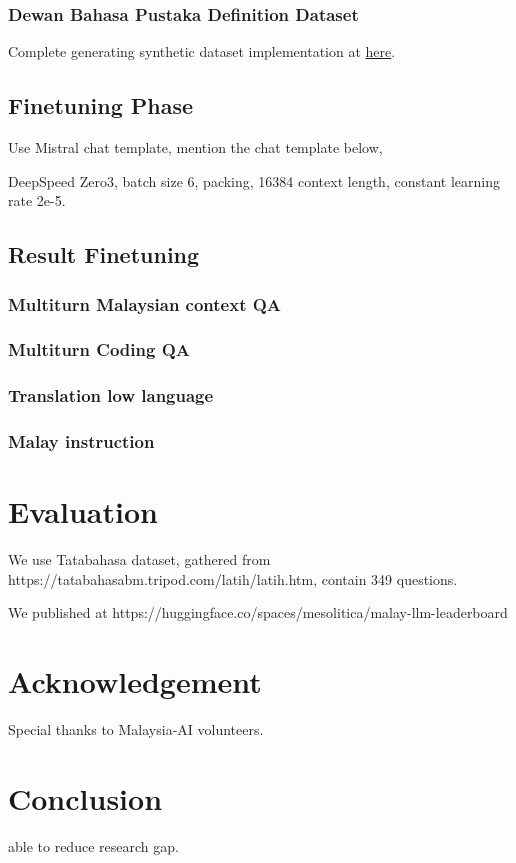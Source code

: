 \documentclass{article}
\begin{document}
\subsubsection{Dewan Bahasa Pustaka Definition Dataset}

Complete generating synthetic dataset implementation at \href{https://a.com}{here}.

\subsection{Finetuning Phase}

Use Mistral chat template, mention the chat template below,

DeepSpeed Zero3, batch size 6, packing, 16384 context length, constant learning rate 2e-5.


\subsection{Result Finetuning}

\subsubsection{Multiturn Malaysian context QA}

\subsubsection{Multiturn Coding QA}

\subsubsection{Translation low language}

\subsubsection{Malay instruction}

\section{Evaluation}

We use Tatabahasa dataset, gathered from https://tatabahasabm.tripod.com/latih/latih.htm, contain 349 questions.

We published at https://huggingface.co/spaces/mesolitica/malay-llm-leaderboard

\section{Acknowledgement}

Special thanks to Malaysia-AI volunteers.

\section{Conclusion}

able to reduce research gap.

{}

\end{document}
